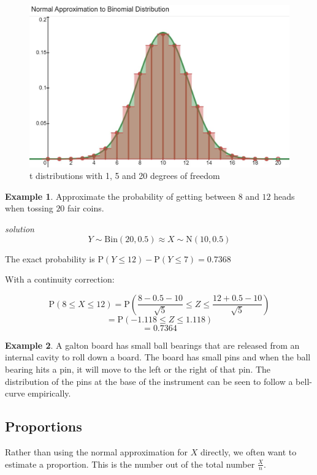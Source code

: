 \documentclass[
]{book}
\theoremstyle{definition}
\theoremstyle{definition}
\newtheorem{example}{Example}[chapter]
\theoremstyle{definition}
\theoremstyle{definition}
\theoremstyle{remark}
\begin{document}
\begin{figure}

{\centering \includegraphics[width=0.75\linewidth]{./figures/normapprox} 

}

\caption{t distributions with 1, 5 and 20 degrees of freedom}\label{fig:napprox}
\end{figure}

\begin{example}
Approximate the probability of getting between \(8\) and \(12\) heads when tossing \(20\) fair coins.

\emph{solution}
\[Y \sim \text{Bin}(20,0.5) \approx X\sim \text{N}(10,0.5)\]

The exact probability is \(\text{P}(Y\leq 12) - \text{P}(Y\leq 7) = 0.7368\)

With a continuity correction:

\[\text{P}(8\leq X\leq12) = \text{P}\left(\frac{8-0.5-10}{\sqrt{5}} \leq Z \leq \frac{12+0.5-10}{\sqrt{5}} \right) \]
\[=\text{P}(-1.118\leq Z \leq 1.118)\]
\[=0.7364\]
\end{example}

\begin{example}
A galton board has small ball bearings that are released from an internal cavity to roll down a board. The board has small pins and when the ball bearing hits a pin, it will move to the left or the right of that pin. The distribution of the pins at the base of the instrument can be seen to follow a bell-curve empirically.
\end{example}

\hypertarget{proportions}{%
\subsection{Proportions}\label{proportions}}

Rather than using the normal approximation for \(X\) directly, we often want to estimate a proportion. This is the number out of the total number \(\frac{X}{n}\).
\end{document}
